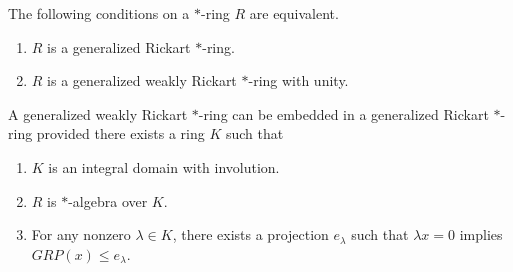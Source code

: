 \documentclass[10pt,a4paper]{amsart}
\begin{document}
\begin{proposition} \label{s2pr8} The following conditions on a $*$-ring $R$ are equivalent.
	\begin{enumerate}
		\item $R$ is a generalized  Rickart $*$-ring.  
		\item $R$ is a generalized weakly Rickart $*$-ring with unity.
	\end{enumerate}
\end{proposition}

\begin{theorem}  A generalized weakly Rickart $*$-ring can be embedded in a generalized Rickart $*$-ring
provided there exists a ring $K$ such that
\begin{enumerate}
	\item  $K$ is an integral domain with involution.
	\item  $R$ is $*$-algebra over $K$. 
	\item  For any nonzero $\lambda\in K$, there exists a projection $e_\lambda$ such that $\lambda x=0$ implies   $GRP(x)\leq e_\lambda$.
\end{enumerate}
\end{theorem}
\end{document}
